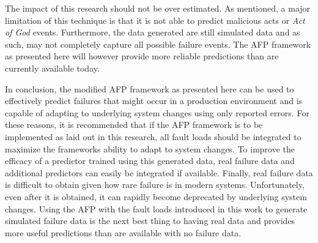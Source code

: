 The impact of this research should not be over estimated.  As mentioned, a
major limitation of this technique is that it is not able to predict malicious
acts or \emph{Act of God} events.  Furthermore, the data generated are still
simulated data and as such, may not completely capture all possible failure
events.  The \ac{AFP} framework as presented here will however provide more
reliable predictions than are currently available today.

In conclusion, the modified \ac{AFP} framework as presented here can be used to
effectively predict failures that might occur in a production environment and
is capable of adapting to underlying system changes using only reported errors.
For these reasons, it is recommended that if the \ac{AFP} framework is to be
implemented as laid out in this research, all fault loads should be integrated
to maximize the frameworks ability to adapt to system changes.  To improve the
efficacy of a predictor trained using this generated data, real failure data
and additional predictors can easily be integrated if available.  Finally, real
failure data is difficult to obtain given how rare failure is in modern
systems.  Unfortunately, even after it is obtained, it can rapidly become
deprecated by underlying system changes.  Using the \ac{AFP} with the fault
loads introduced in this work to generate simulated failure data is the next
best thing to having real data and provides more useful predictions than are
available with no failure data.
